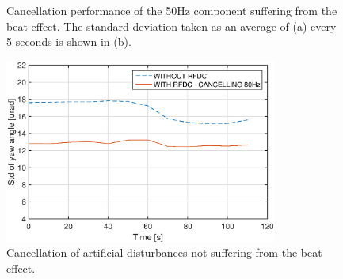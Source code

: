 \begin{figure}[h!]
  \centering %
  \qquad
  \caption{\label{fig:beateffect} Cancellation performance of the 50Hz component suffering from the beat effect. The standard deviation taken as an average of (a) every 5 seconds is shown in (b).}
\end{figure}

\begin{figure}[h!]
  \centering %
  \includegraphics[width=0.8\textwidth, trim=0cm 0cm 0cm 0cm, clip=true]{fig/matlab/no_beat_effect_dist_injected_programatically}
  \caption{\label{fig:nobeat}Cancellation of artificial disturbances not suffering from the beat effect.}
\end{figure}
